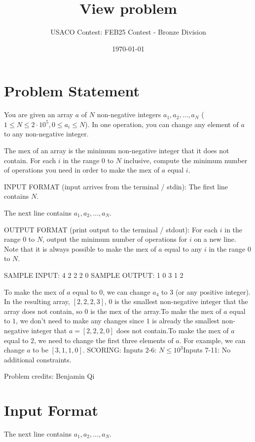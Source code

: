 \documentclass[12pt]{article}
\title{View problem}
\author{USACO Contest: FEB25 Contest - Bronze Division}
\date{\today}
\begin{document}
\maketitle

\section*{Problem Statement}


You are given an array $a$ of $N$ non-negative integers $a_1, a_2, \dots, a_N$
($1\le N\le 2\cdot 10^5, 0\le a_i\le N$). In one operation, you can change any
element of $a$ to any non-negative integer.

The mex of an array is the minimum non-negative integer that it does not
contain. For each $i$ in the range $0$ to $N$ inclusive, compute the minimum
number of operations you need  in order to make the mex of $a$ equal $i$.

INPUT FORMAT (input arrives from the terminal / stdin):
The first line contains $N$.

The next line contains $a_1,a_2,\dots, a_N$.


OUTPUT FORMAT (print output to the terminal / stdout):
For each $i$ in the range $0$ to $N$, output the minimum number of operations
for $i$ on a new line. Note that it is always possible to make the mex of $a$
equal to any $i$ in the range $0$ to $N$.

SAMPLE INPUT:
4
2 2 2 0
SAMPLE OUTPUT: 
1
0
3
1
2

To make the mex of $a$ equal to $0$, we can change $a_4$ to $3$ (or any
positive integer). In the resulting array, $[2, 2, 2, 3]$, $0$ is the smallest
non-negative integer that the array does not contain, so $0$ is the mex of the
array.To make the mex of $a$ equal to $1$, we don't need to make any changes since
$1$ is already the smallest non-negative integer that $a = [2, 2, 2, 0]$ does
not contain.To make the mex of $a$ equal to $2$, we need to change the first three
elements of $a$. For example, we can change $a$ to be $[3, 1, 1, 0]$.
SCORING:
Inputs 2-6: $N\le 10^3$Inputs 7-11: No additional constraints.


Problem credits: Benjamin Qi



\section*{Input Format}
The next line contains $a_1,a_2,\dots, a_N$.
\end{document}
